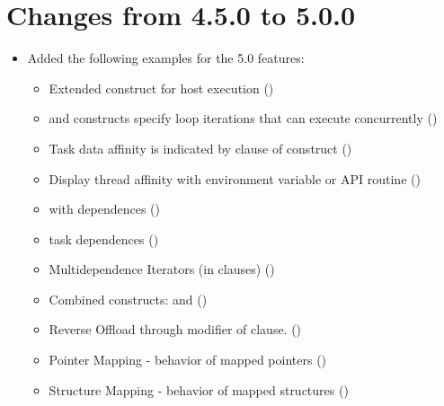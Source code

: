 \section{Changes from 4.5.0 to 5.0.0}
\label{sec:history_45_to_50}

\begin{itemize}
\item Added the following examples for the 5.0 features:

\begin{itemize}
\item Extended  construct for host execution     ()
\item {} and  constructs specify loop iterations that can execute concurrently 
                                                             ()
\item Task data affinity is indicated by  clause of  construct
                                                             ()
\item Display thread affinity with  environment variable or  API routine
                                                             ()
\item {} with dependences                       ()
\item {} task dependences                  ()
\item Multidependence Iterators (in  clauses)   ()
\item Combined constructs:  and 
                                                                                  ()
\item Reverse Offload through  modifier of  clause.    ()
\item Pointer Mapping  - behavior of mapped pointers                              ()   %
\item Structure Mapping  - behavior of mapped structures                          () %

\end{itemize}
\end{itemize}
